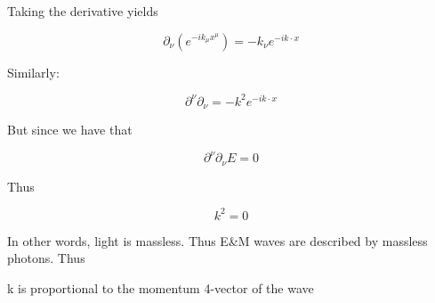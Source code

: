 \documentclass{article}
\newtheorem{one minute paper}[theorem]{One Minute Paper}
\begin{document}
Taking the derivative yields

\begin{equation}
    \partial_{\nu} (e^{-ik_\mu x^\mu}) = -k_{\nu}e^{-ik \cdot x}
\end{equation}

Similarly:

\begin{equation}
    \partial^\nu \partial_\nu = -k^2e^{-ik \cdot x}
\end{equation}

But since we have that 

\begin{equation}
    \partial^\nu \partial_\nu E = 0
\end{equation}

Thus

\begin{equation}
    k^2 = 0
\end{equation}

In other words, light is massless. Thus E\&M waves are described by massless photons. Thus 

\begin{center}
    k is proportional to the momentum 4-vector of the wave
\end{center}
\end{document}
